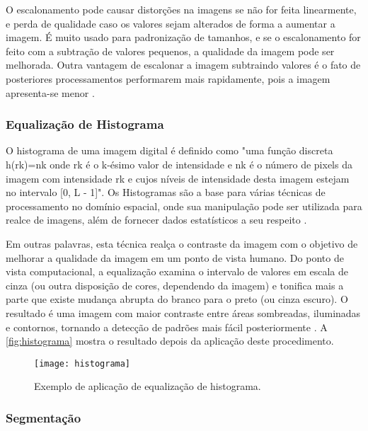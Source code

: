 O escalonamento pode causar distorções na imagens se não for feita linearmente, e perda de qualidade caso os valores sejam alterados de forma a aumentar a imagem. É muito usado para padronização de tamanhos, e se o escalonamento for feito com a subtração de valores pequenos, a qualidade da imagem pode ser melhorada. Outra vantagem de escalonar a imagem subtraindo valores é o fato de posteriores processamentos performarem mais rapidamente, pois a imagem apresenta-se menor \cite{drmathew_java_programming}. 


\subsubsection{Equalização de Histograma}\label{subsubsec:equalizacao}

O histograma de uma imagem digital é definido como "uma função discreta h(rk)=nk onde  rk é o k-ésimo valor de intensidade e nk  é o número de pixels da imagem com intensidade rk e cujos níveis de intensidade desta imagem estejam no intervalo [0, L - 1]". Os Histogramas são a base para várias técnicas de processamento no domínio espacial, onde sua manipulação pode ser utilizada para realce de imagens, além de fornecer dados estatísticos a seu respeito \cite{gonzalez_woods}.

Em outras palavras, esta técnica realça o contraste da imagem com o objetivo de melhorar a qualidade da imagem em um ponto de vista humano. Do ponto de vista computacional, a equalização examina o intervalo de valores em escala de cinza (ou outra disposição de cores, dependendo da imagem) e tonifica mais a parte que existe mudança abrupta do branco para o preto (ou cinza escuro). O resultado é uma imagem com maior contraste entre áreas sombreadas, iluminadas e contornos, tornando a detecção de padrões mais fácil posteriormente \cite{drmathew_java_programming}. A \autoref{fig:histograma} mostra o resultado depois da aplicação deste procedimento.

\begin{figure}[h]
	\centering
	\texttt{[image: histograma]}
	\caption{Exemplo de aplicação de equalização de  histograma.}
	\label{fig:histograma}
\end{figure}



\subsubsection{Segmentação}\label{subsubsec:segmentacao}

